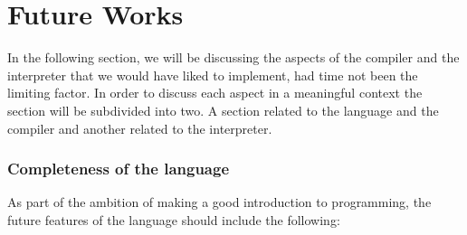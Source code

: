 \chapter{Future Works}

In the following section, we will be discussing the aspects of the compiler and the interpreter that we would have liked to implement, had time not been the limiting factor. In order to discuss each aspect in a meaningful context the section will be subdivided into two. A section related to the language and the compiler and another related to the interpreter.

\subsection*{Completeness of the language}
As part of the ambition of making \dazel{} a good introduction to programming, the future features of the language should include the following: 

